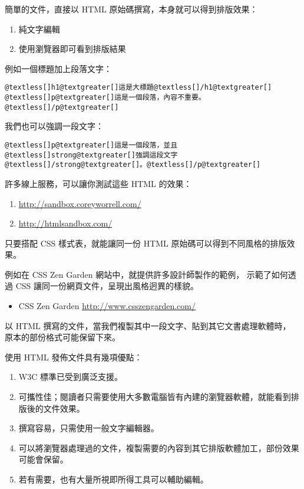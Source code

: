\documentclass[a4paper,12pt,english]{sphinxmanual}
\begin{document}
簡單的文件，直接以 HTML 原始碼撰寫，本身就可以得到排版效果：
\begin{enumerate}
\item {} 
純文字編輯

\item {} 
使用瀏覽器即可看到排版結果

\end{enumerate}

例如一個標題加上段落文字：

\begin{Verbatim}[commandchars=@\[\]]
@textless[]h1@textgreater[]這是大標題@textless[]/h1@textgreater[]
@textless[]p@textgreater[]這是一個段落，內容不重要。@textless[]/p@textgreater[]
\end{Verbatim}

我們也可以強調一段文字：

\begin{Verbatim}[commandchars=@\[\]]
@textless[]p@textgreater[]這是一個段落，並且@textless[]strong@textgreater[]強調這段文字@textless[]/strong@textgreater[]。@textless[]/p@textgreater[]
\end{Verbatim}

許多線上服務，可以讓你測試這些 HTML 的效果：
\begin{enumerate}
\item {} 
\href{http://sandbox.coreyworrell.com/}{http://sandbox.coreyworrell.com/}

\item {} 
\href{http://htmlsandbox.com/}{http://htmlsandbox.com/}

\end{enumerate}

只要搭配 CSS 樣式表，就能讓同一份 HTML 原始碼可以得到不同風格的排版效果。

例如在 CSS Zen Garden 網站中，就提供許多設計師製作的範例，
示範了如何透過 CSS 讓同一份網頁文件，呈現出風格迥異的樣貌。
\begin{itemize}
\item {} 
CSS Zen Garden \href{http://www.csszengarden.com/}{http://www.csszengarden.com/}

\end{itemize}

以 HTML 撰寫的文件，當我們複製其中一段文字、貼到其它文書處理軟體時，
原本的部份格式可能保留下來。

使用 HTML 發佈文件具有幾項優點：
\begin{enumerate}
\item {} 
W3C 標準已受到廣泛支援。

\item {} 
可攜性佳；閱讀者只需要使用大多數電腦皆有內建的瀏覽器軟體，就能看到排版後的文件效果。

\item {} 
撰寫容易，只需使用一般文字編輯器。

\item {} 
可以將瀏覽器處理過的文件，複製需要的內容到其它排版軟體加工，部份效果可能會保留。

\item {} 
若有需要，也有大量所視即所得工具可以輔助編輯。

\end{enumerate}
\end{document}
